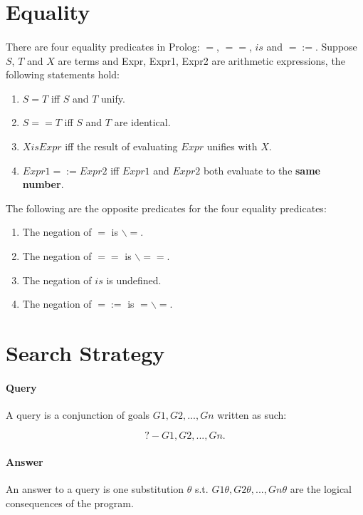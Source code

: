 \documentclass{article}
\begin{document}
\begin{multicols}{2}
  \section{Equality}
  
  \paragraph{} There are four equality predicates in Prolog: $=$, $==$, $is$ and $=:=$. Suppose $S$, $T$ and $X$ are terms and Expr, Expr1, Expr2 are arithmetic expressions, the following statements hold:
  
  \begin{enumerate}
  \item $S = T$ iff $S$ and $T$ unify.
  \item $S == T$ iff $S$ and $T$ are identical.
  \item $X is Expr$ iff the result of evaluating $Expr$ unifies with $X$.
  \item $Expr1 =:= Expr2$ iff $Expr1$ and $Expr2$ both evaluate to the {\bf same number}.
  \end{enumerate}
  
  The following are the opposite predicates for the four equality predicates:
  
  \begin{enumerate}
  \item The negation of $=$ is $\backslash=$.
  \item The negation of $==$ is $\backslash==$.
  \item The negation of $is$ is undefined.
  \item The negation of $=:=$ is $=\backslash=$.
  \end{enumerate}
  
  \section{Search Strategy}
  
  \paragraph{Query} A query is a conjunction of goals $G1, G2, ..., Gn$ written as such:
  
  $$?- G1, G2, ..., Gn.$$
  
  \paragraph{Answer} An answer to a query is one substitution $\theta$ s.t. $G1\theta, G2\theta, ..., Gn\theta$ are the logical consequences of the program.
  

\end{multicols}
\end{document}
